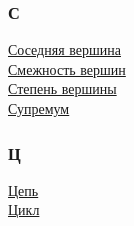 \begin{multicols}{3}
\subsubsection*{С} \noindent
\hyperlink{def:adjacency_of_vertexes}{Соседняя вершина} \\
\hyperlink{def:adjacency_of_vertexes}{Смежность вершин} \\
\hyperlink{def:degree_of_vertex}{Степень вершины} \\
\hyperlink{def:supremum}{Супремум}
\subsubsection*{Ц} \noindent
\hyperlink{def:trail}{Цепь} \\
\hyperlink{def:cycle}{Цикл}
\end{multicols}